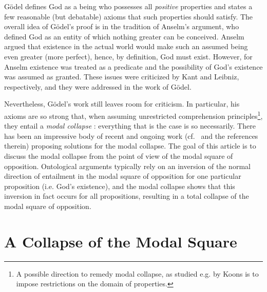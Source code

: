 \documentclass{birkmult}
\theoremstyle{definition}
\theoremstyle{remark}
\numberwithin{equation}{section}
\begin{document}
G\"{o}del defines God as a being who possesses all \emph{positive}
properties and states a few reasonable (but debatable) axioms that
such properties should satisfy.  The overall idea of G{\"o}del's proof
is in the tradition of Anselm's argument, who defined God as an
entity of which nothing greater can be conceived.  Anselm argued that
existence in the actual world would make such an assumed being even
greater (more perfect), hence, by definition, God must exist. However,
for Anselm existence was treated as a predicate and the possibility of
God's existence was assumed as granted.  These issues were criticized
by Kant and Leibniz, respectively, and they were addressed in the work
of G\"odel.

Nevertheless, G{\"o}del's work still leaves room for criticism.  In
particular, his axioms are so strong that, when assuming unrestricted
comprehension principles\footnote{A possible direction to remedy modal
  collapse, as studied e.g. by Koons
  \cite{koons06:_sobel_goedel_ontol_proof} is to impose restrictions
  on the domain of properties.}, 
they entail a \emph{modal collapse}
\cite{Sobel1987,sobel2004logic}: everything that is the case is so
necessarily.  There has been an impressive body of recent and ongoing
work
(cf.~\cite{sobel2004logic,Fitting,anderson90:_some_emend_of_goedel_ontol_proof,AndersonGettings,bjordal99,fuhrmann05:_exist_notwen,Hajek2002,Hajek2008,ContemporaryBibliography}
and the references therein) proposing solutions for the modal
collapse.  The goal of this article is to discuss the modal
collapse from the point of view of the modal square of opposition. 
Ontological arguments typically rely on an inversion of the normal direction of entailment
in the modal square of opposition for one particular proposition (i.e. God's existence), 
and the modal collapse shows that this inversion in fact occurs for all propositions, resulting in a total collapse of the modal square of opposition.



\section{A Collapse of the Modal Square}
\end{document}
